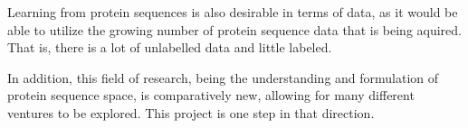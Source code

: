 \documentclass[a4paper,11pt]{article}
\begin{document}
Learning from protein sequences is also desirable in terms of data, as it would be able to utilize the growing number of protein sequence data that is being aquired. That is, there is a lot of unlabelled data and little labeled.

In addition, this field of research, being the understanding and formulation of protein sequence space, is comparatively new, allowing for many different ventures to be explored. This project is one step in that direction.







\end{document}
